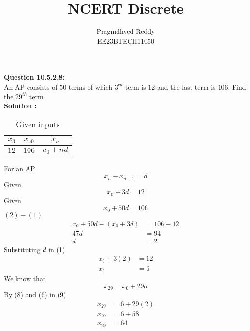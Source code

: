 \documentclass[journal,12pt,twocolumn]{IEEEtran}
\title{NCERT Discrete}
\author{Pragnidhved Reddy\\EE23BTECH11050}
\date{}
\begin{document}
\maketitle
\newpage
\bigskip
\textbf{Question 10.5.2.8:}\\
An AP consists of $50$ terms of which $3^{rd}$ term is $12$ and the last term is $106$. Find the $29^{th}$ term.\\
\textbf{Solution :}\\
\begin{table}[H]
\centering
\begin{tabular}{|c|c|c|}\hline
$x_3$ & $x_{50}$ & $x_{n}$\\ \hline
$12$ & $106$ & $a_0+nd$\\ \hline
\end{tabular}
\caption{Given inputs}
\end{table}
For an AP
\begin{equation}
x_n-x_{n-1}=d
\end{equation}
Given \\
\begin{equation}
 x_0+3d=12
 \end{equation}
 Given \\
 \begin{equation}
x_0+50d=106
 \end{equation}
 $(2)-(1)$
 \begin{align}
 x_0+50d-(x_0+3d)&=106-12\\
 47d&=94\\
 d&=2
 \end{align}
 Substituting $d$ in (1)
 \begin{align}
 x_0+3(2)&=12\\
 x_0&=6
 \end{align}
 We know that
 \begin{equation}
 x_{29}=x_0+29d
 \end{equation}
 By (8) and (6) in (9) 
 \begin{align}
 x_{29}&=6+29(2)\\
 x_{29}&=6+58\\
 x_{29}&=64
 \end{align}
 
\end{document}
